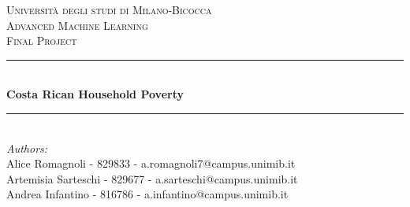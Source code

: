 \begin{titlepage}

\newcommand{\HRule}{\rule{\linewidth}{0.5mm}} %

\center %
 

\textsc{\LARGE Università degli studi di Milano-Bicocca}\\[1cm] %
\textsc{\Large Advanced Machine Learning }\\[0.3cm] %
\textsc{\large Final Project}\\[0.1cm] %


\HRule \\[0.4cm]
{ \huge \bfseries Costa Rican Household Poverty}\\[0.4cm] %
\HRule \\[1.5cm]
 

\large
\emph{Authors:}\\
Alice Romagnoli - 829833 - a.romagnoli7@campus.unimib.it \\   %
Artemisia Sarteschi - 829677 - a.sarteschi@campus.unimib.it \\ %
Andrea Infantino - 816786 - a.infantino@campus.unimib.it   \\[1cm]



\end{titlepage}
